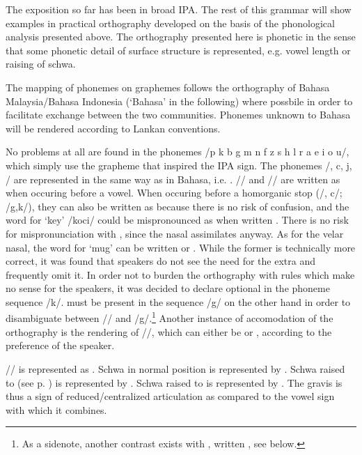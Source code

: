 The exposition so far has been in broad IPA. The rest of this grammar will show examples in  practical orthography developed on the basis of the phonological analysis presented above. The orthography presented here is phonetic in the sense that some phonetic detail of surface structure is represented, e.g. vowel length or raising of schwa.

The mapping of phonemes on graphemes follows the orthography of Bahasa   Malaysia/Bahasa Indonesia (`Bahasa' in the following) where possbile in order to facilitate exchange between the two communities. Phonemes unknown to Bahasa will be rendered according to Lankan conventions.

No problems at all are found in the phonemes /p k b g  m n f z s h l r a e i o u/, which simply use the grapheme that inspired the IPA sign.
The phonemes /\J, c,  j, \V / are represented in the same way as in Bahasa, i.e. . /\ny/ and  /\ng/ are written as  when occuring before a vowel. When occuring before a homorganic stop (/\J, c/; /g,k/), they can also be written as  because there is no risk of confusion, and the word for `key' /ko\ny ci/ could be mispronounced as  when written . There is no risk for mispronunciation with , since the nasal assimilates anyway. As for the velar nasal, the word for `mug' can be written   or . While the former is technically more correct, it was found that speakers do not see the need for the extra  and frequently omit it. In order not to burden the orthography with rules which make no sense for the speakers, it was decided to declare  optional in the phoneme sequence /\ng k/.  must be present in the sequence /\ng g/ on the other hand in order to disambiguate between /\ng/ and /\ng g/.\footnote{As a sidenote, another contrast exists with \phonem{\ng:}, written , see below.} Another instance of accomodation of the orthography is the rendering of /\V/, which can either be  or , according to the preference of the speaker.

/\textesh/ is represented as . Schwa in normal position is represented by . Schwa raised to  (see p. \pageref{ex:phon:rep:sIggar}) is represented by  . Schwa raised to  is represented by . The gravis is thus a sign of reduced/centralized articulation as compared to the vowel sign with which it combines.

